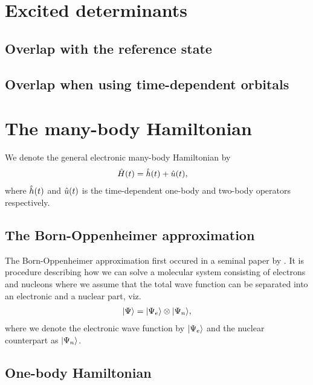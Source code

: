     \section{Excited determinants}
        \subsection{Overlap with the reference state}
        \subsection{Overlap when using time-dependent orbitals}

    \section{The many-body Hamiltonian}
        We denote the general electronic many-body Hamiltonian by
        \begin{align}
            \hat{H}(t) &= \hat{h}(t) + \hat{u}(t),
        \end{align}
        where $\hat{h}(t)$ and $\hat{u}(t)$ is the time-dependent one-body
        and two-body operators respectively.

        \subsection{The Born-Oppenheimer approximation}
            The Born-Oppenheimer approximation first occured in a seminal paper
            by \citeauthor{born1927quantentheorie}
            \cite{born1927quantentheorie}.
            It is procedure describing how we can solve a molecular system
            consisting of electrons and nucleons where we assume that the total
            wave function can be separated into an electronic and a nuclear
            part, viz.
            \begin{align}
                | \Psi \rangle = | \Psi_e \rangle\otimes| \Psi_n \rangle,
            \end{align}
            where we denote the electronic wave function by $| \Psi_e \rangle$ and
            the nuclear counterpart as $| \Psi_n \rangle$.

        \subsection{One-body Hamiltonian}
